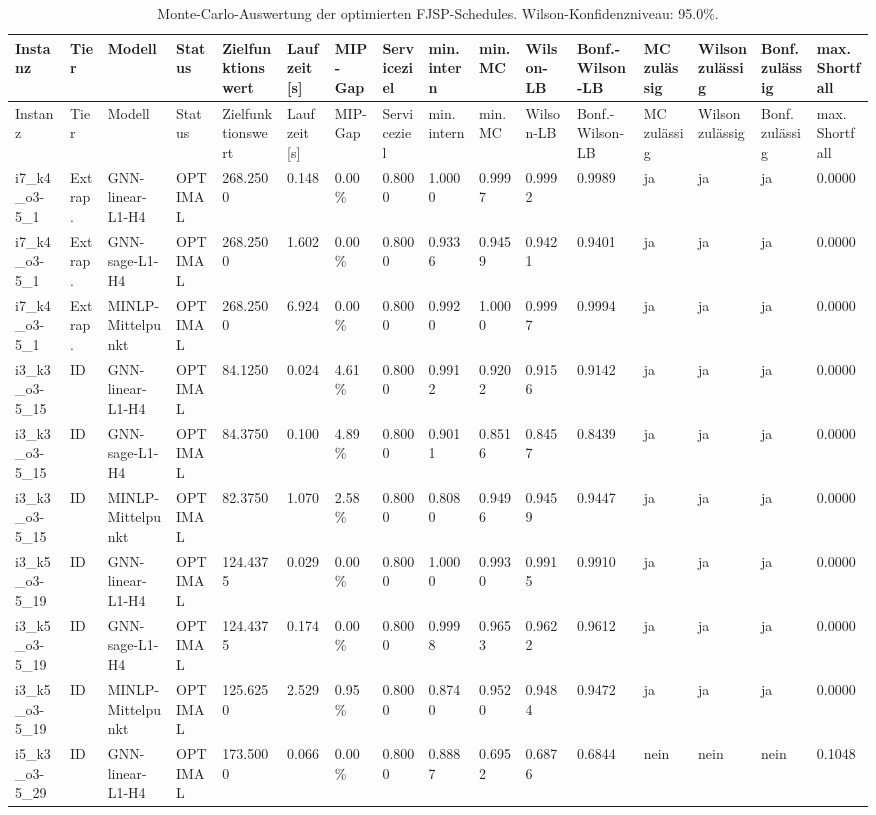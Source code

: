 \documentclass[a4paper,landscape]{article}
\begin{document}
\scriptsize
\setlength{\tabcolsep}{2.5pt}
\begin{longtable}{llllllllllllllll}
\caption{Monte-Carlo-Auswertung der optimierten FJSP-Schedules. Wilson-Konfidenzniveau: 95.0\%.}\label{tab:fjsp-results} \\
\toprule
Instanz & Tier & Modell & Status & Zielfunktionswert & Laufzeit [s] & MIP-Gap & Serviceziel & min. intern & min. MC & Wilson-LB & Bonf.-Wilson-LB & MC zulässig & Wilson zulässig & Bonf. zulässig & max. Shortfall \\
\midrule
\endfirsthead
\toprule
Instanz & Tier & Modell & Status & Zielfunktionswert & Laufzeit [s] & MIP-Gap & Serviceziel & min. intern & min. MC & Wilson-LB & Bonf.-Wilson-LB & MC zulässig & Wilson zulässig & Bonf. zulässig & max. Shortfall \\
\midrule
\endhead
i7\_k4\_o3-5\_1 & Extrap. & GNN-linear-L1-H4 & OPTIMAL & 268.2500 & 0.148 & 0.00\% & 0.8000 & 1.0000 & 0.9997 & 0.9992 & 0.9989 & ja & ja & ja & 0.0000 \\
i7\_k4\_o3-5\_1 & Extrap. & GNN-sage-L1-H4 & OPTIMAL & 268.2500 & 1.602 & 0.00\% & 0.8000 & 0.9336 & 0.9459 & 0.9421 & 0.9401 & ja & ja & ja & 0.0000 \\
i7\_k4\_o3-5\_1 & Extrap. & MINLP-Mittelpunkt & OPTIMAL & 268.2500 & 6.924 & 0.00\% & 0.8000 & 0.9920 & 1.0000 & 0.9997 & 0.9994 & ja & ja & ja & 0.0000 \\
i3\_k3\_o3-5\_15 & ID & GNN-linear-L1-H4 & OPTIMAL & 84.1250 & 0.024 & 4.61\% & 0.8000 & 0.9912 & 0.9202 & 0.9156 & 0.9142 & ja & ja & ja & 0.0000 \\
i3\_k3\_o3-5\_15 & ID & GNN-sage-L1-H4 & OPTIMAL & 84.3750 & 0.100 & 4.89\% & 0.8000 & 0.9011 & 0.8516 & 0.8457 & 0.8439 & ja & ja & ja & 0.0000 \\
i3\_k3\_o3-5\_15 & ID & MINLP-Mittelpunkt & OPTIMAL & 82.3750 & 1.070 & 2.58\% & 0.8000 & 0.8080 & 0.9496 & 0.9459 & 0.9447 & ja & ja & ja & 0.0000 \\
i3\_k5\_o3-5\_19 & ID & GNN-linear-L1-H4 & OPTIMAL & 124.4375 & 0.029 & 0.00\% & 0.8000 & 1.0000 & 0.9930 & 0.9915 & 0.9910 & ja & ja & ja & 0.0000 \\
i3\_k5\_o3-5\_19 & ID & GNN-sage-L1-H4 & OPTIMAL & 124.4375 & 0.174 & 0.00\% & 0.8000 & 0.9998 & 0.9653 & 0.9622 & 0.9612 & ja & ja & ja & 0.0000 \\
i3\_k5\_o3-5\_19 & ID & MINLP-Mittelpunkt & OPTIMAL & 125.6250 & 2.529 & 0.95\% & 0.8000 & 0.8740 & 0.9520 & 0.9484 & 0.9472 & ja & ja & ja & 0.0000 \\
i5\_k3\_o3-5\_29 & ID & GNN-linear-L1-H4 & OPTIMAL & 173.5000 & 0.066 & 0.00\% & 0.8000 & 0.8887 & 0.6952 & 0.6876 & 0.6844 & nein & nein & nein & 0.1048 \\

\end{longtable}
\end{document}
